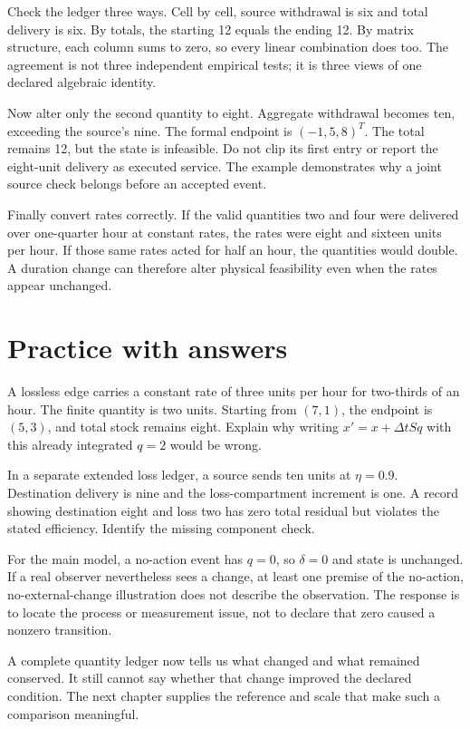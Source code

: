 Check the ledger three ways. Cell by cell, source withdrawal is six and total delivery is six. By totals, the starting 12 equals the ending 12. By matrix structure, each column sums to zero, so every linear combination does too. The agreement is not three independent empirical tests; it is three views of one declared algebraic identity.

Now alter only the second quantity to eight. Aggregate withdrawal becomes ten, exceeding the source's nine. The formal endpoint is \((-1,5,8)^T\). The total remains 12, but the state is infeasible. Do not clip its first entry or report the eight-unit delivery as executed service. The example demonstrates why a joint source check belongs before an accepted event.

Finally convert rates correctly. If the valid quantities two and four were delivered over one-quarter hour at constant rates, the rates were eight and sixteen units per hour. If those same rates acted for half an hour, the quantities would double. A duration change can therefore alter physical feasibility even when the rates appear unchanged.

\section{Practice with answers}
A lossless edge carries a constant rate of three units per hour for two-thirds of an hour. The finite quantity is two units. Starting from \((7,1)\), the endpoint is \((5,3)\), and total stock remains eight. Explain why writing \(x'=x+\Delta t S q\) with this already integrated \(q=2\) would be wrong.

In a separate extended loss ledger, a source sends ten units at \(\eta=0.9\). Destination delivery is nine and the loss-compartment increment is one. A record showing destination eight and loss two has zero total residual but violates the stated efficiency. Identify the missing component check.

For the main model, a no-action event has \(q=0\), so \(\delta=0\) and state is unchanged. If a real observer nevertheless sees a change, at least one premise of the no-action, no-external-change illustration does not describe the observation. The response is to locate the process or measurement issue, not to declare that zero caused a nonzero transition.

A complete quantity ledger now tells us what changed and what remained conserved. It still cannot say whether that change improved the declared condition. The next chapter supplies the reference and scale that make such a comparison meaningful.
